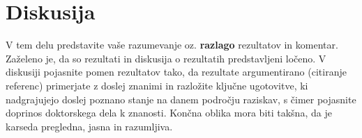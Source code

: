 \chapter{Diskusija}\label{cha:diskusija}

V tem delu predstavite vaše razumevanje oz. \textbf{razlago} rezultatov in komentar. Zaželeno je, da so rezultati in diskusija o rezultatih predstavljeni ločeno. V diskusiji pojasnite pomen rezultatov tako, da rezultate argumentirano (citiranje referenc) primerjate z doslej znanimi in razložite ključne ugotovitve, ki nadgrajujejo doslej poznano stanje na danem področju raziskav, s čimer pojasnite doprinos doktorskega dela k znanosti. Končna oblika mora biti takšna, da je karseda pregledna, jasna in razumljiva.